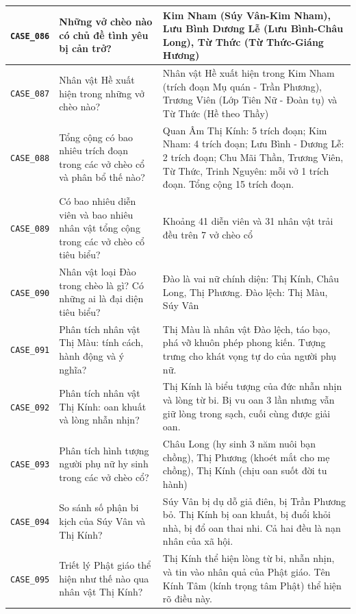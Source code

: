 \begin{longtable}{|p{1.9cm}|p{5.2cm}|p{7.3cm}|}
  \hline
  \texttt{CASE\_086} & Những vở chèo nào có chủ đề tình yêu bị cản trở? & Kim Nham (Súy Vân-Kim Nham), Lưu Bình Dương Lễ (Lưu Bình-Châu Long), Từ Thức (Từ Thức-Giáng Hương) \\
  \hline
  \texttt{CASE\_087} & Nhân vật Hề xuất hiện trong những vở chèo nào? & Nhân vật Hề xuất hiện trong Kim Nham (trích đoạn Mụ quán - Trần Phương), Trương Viên (Lớp Tiên Nữ - Đoàn tụ) và Từ Thức (Hề theo Thầy) \\
  \hline
  \texttt{CASE\_088} & Tổng cộng có bao nhiêu trích đoạn trong các vở chèo cổ và phân bổ thế nào? & Quan Âm Thị Kính: 5 trích đoạn; Kim Nham: 4 trích đoạn; Lưu Bình - Dương Lễ: 2 trích đoạn; Chu Mãi Thần, Trương Viên, Từ Thức, Trinh Nguyên: mỗi vở 1 trích đoạn. Tổng cộng 15 trích đoạn. \\
  \hline
  \texttt{CASE\_089} & Có bao nhiêu diễn viên và bao nhiêu nhân vật tổng cộng trong các vở chèo cổ tiêu biểu? & Khoảng 41 diễn viên và 31 nhân vật trải đều trên 7 vở chèo cổ \\
  \hline
  \texttt{CASE\_090} & Nhân vật loại Đào trong chèo là gì? Có những ai là đại diện tiêu biểu? & Đào là vai nữ chính diện: Thị Kính, Châu Long, Thị Phương. Đào lệch: Thị Màu, Súy Vân \\
  \hline
  \texttt{CASE\_091} & Phân tích nhân vật Thị Màu: tính cách, hành động và ý nghĩa? & Thị Màu là nhân vật Đào lệch, táo bạo, phá vỡ khuôn phép phong kiến. Tượng trưng cho khát vọng tự do của người phụ nữ. \\
  \hline
  \texttt{CASE\_092} & Phân tích nhân vật Thị Kính: oan khuất và lòng nhẫn nhịn? & Thị Kính là biểu tượng của đức nhẫn nhịn và lòng từ bi. Bị vu oan 3 lần nhưng vẫn giữ lòng trong sạch, cuối cùng được giải oan. \\
  \hline
  \texttt{CASE\_093} & Phân tích hình tượng người phụ nữ hy sinh trong các vở chèo cổ? & Châu Long (hy sinh 3 năm nuôi bạn chồng), Thị Phương (khoét mắt cho mẹ chồng), Thị Kính (chịu oan suốt đời tu hành) \\
  \hline
  \texttt{CASE\_094} & So sánh số phận bi kịch của Súy Vân và Thị Kính? & Súy Vân bị dụ dỗ giả điên, bị Trần Phương bỏ. Thị Kính bị oan khuất, bị đuổi khỏi nhà, bị đổ oan thai nhi. Cả hai đều là nạn nhân của xã hội. \\
  \hline
  \texttt{CASE\_095} & Triết lý Phật giáo thể hiện như thế nào qua nhân vật Thị Kính? & Thị Kính thể hiện lòng từ bi, nhẫn nhịn, và tin vào nhân quả của Phật giáo. Tên Kính Tâm (kính trọng tâm Phật) thể hiện rõ điều này. \\

\end{longtable}
